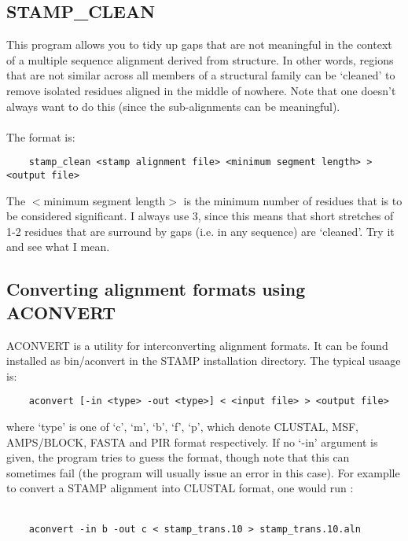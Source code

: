     \subsection{STAMP\_CLEAN}

    This program allows you to tidy up gaps that are not meaningful in the context
    of a multiple sequence alignment derived from structure.  In other words, regions
    that are not similar across all members of a structural family can be `cleaned' to
    remove isolated residues aligned in the middle of nowhere.  Note that one doesn't always 
    want  to do this (since the sub-alignments can be meaningful).\\
    \\
    The format is:

    \begin{scriptsize}\begin{verbatim}
    stamp_clean <stamp alignment file> <minimum segment length> > <output file>
    \end{verbatim} \end{scriptsize}

    The $<$minimum segment length$>$ is the minimum number of residues that is to
    be considered significant.  I always use 3, since this means that short stretches of
    1-2 residues that are surround by gaps (i.e. in any sequence) are `cleaned'.  Try it 
    and see what I mean.

    \subsection{Converting alignment formats using ACONVERT}

    ACONVERT is a utility for interconverting alignment formats. It can be found installed
    as bin/aconvert in the STAMP installation directory.  The typical usaage is:

    \begin{scriptsize}\begin{verbatim}
    aconvert [-in <type> -out <type>] < <input file> > <output file>
    \end{verbatim} \end{scriptsize}

    where `type' is one of `c', `m', `b', `f', `p', which denote CLUSTAL, MSF, AMPS/BLOCK,
    FASTA and PIR format respectively.  If no `-in' argument is given, the program tries
    to guess the format, though note that this can sometimes fail (the program will usually
    issue an error in this case).  For examplle to convert a STAMP alignment into CLUSTAL format, one would run :\\
    \\
    \begin{scriptsize}\begin{verbatim}
    aconvert -in b -out c < stamp_trans.10 > stamp_trans.10.aln
    \end{verbatim} \end{scriptsize}


